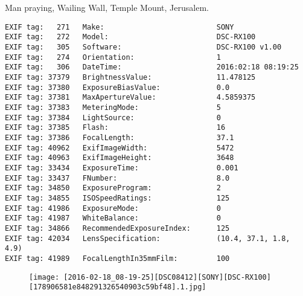 \section{\protect{}}
\noindent Man praying, Wailing Wall, Temple Mount, Jerusalem.
\noindent
\begin{lstlisting}
EXIF tag:   271   Make:                          SONY
EXIF tag:   272   Model:                         DSC-RX100
EXIF tag:   305   Software:                      DSC-RX100 v1.00
EXIF tag:   274   Orientation:                   1
EXIF tag:   306   DateTime:                      2016:02:18 08:19:25
EXIF tag: 37379   BrightnessValue:               11.478125
EXIF tag: 37380   ExposureBiasValue:             0.0
EXIF tag: 37381   MaxApertureValue:              4.5859375
EXIF tag: 37383   MeteringMode:                  5
EXIF tag: 37384   LightSource:                   0
EXIF tag: 37385   Flash:                         16
EXIF tag: 37386   FocalLength:                   37.1
EXIF tag: 40962   ExifImageWidth:                5472
EXIF tag: 40963   ExifImageHeight:               3648
EXIF tag: 33434   ExposureTime:                  0.001
EXIF tag: 33437   FNumber:                       8.0
EXIF tag: 34850   ExposureProgram:               2
EXIF tag: 34855   ISOSpeedRatings:               125
EXIF tag: 41986   ExposureMode:                  0
EXIF tag: 41987   WhiteBalance:                  0
EXIF tag: 34866   RecommendedExposureIndex:      125
EXIF tag: 42034   LensSpecification:             (10.4, 37.1, 1.8, 4.9)
EXIF tag: 41989   FocalLengthIn35mmFilm:         100

\end{lstlisting}
\clearpage
\begin{figure}
\raggedleft
\texttt{[image: [2016-02-18\_08-19-25][DSC08412][SONY][DSC-RX100][178906581e848291326540903c59bf48].1.jpg]}
\end{figure}


\clearpage
